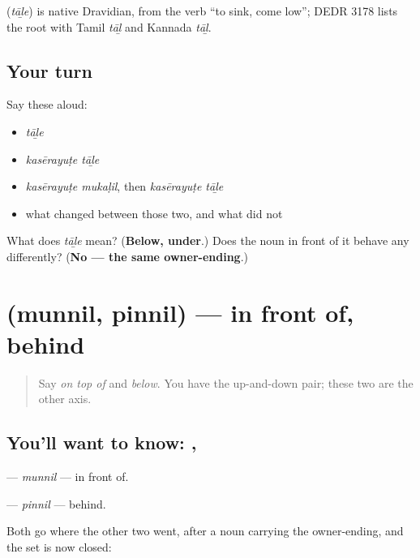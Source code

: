 \begin{cousinweb}
\textbf{} (\emph{tāḻe}) is native Dravidian, from the verb \textquotedblleft{}to sink, come low\textquotedblright{}; DEDR 3178 lists the root with Tamil \emph{tāḻ} and Kannada \emph{tāḻ}.
\end{cousinweb}

\subsection*{Your turn}
Say these aloud:

\begin{itemize}
\raggedright
  \item \emph{tāḻe}
  \item \emph{kasērayuṭe tāḻe}
  \item \emph{kasērayuṭe mukaḷil}, then \emph{kasērayuṭe tāḻe}
  \item what changed between those two, and what did not
\end{itemize}

\begin{tcolorbox}[breakable,colback=teal!4,colframe=teal!35!black,title={Before you move on}]
What does \emph{tāḻe} mean? (\textbf{Below, under}.) Does the noun in front of it behave any differently? (\textbf{No — the same owner-ending}.)
\end{tcolorbox}
\section[\texorpdfstring{\ml{മുന്നിൽ} \ml{പിന്നിൽ} (munnil pinnil)}{മുന്നിൽ പിന്നിൽ (munnil pinnil)}]{  (munnil, pinnil) — in front of, behind}

\label{lesson:ML-C84-munnil-pinnil}



\begin{quote}
Say \emph{on top of} and \emph{below}. You have the up-and-down pair; these two are the other axis.
\end{quote}

\subsection*{You'll want to know: , }
\textbf{} — \emph{munnil} — in front of.

\textbf{} — \emph{pinnil} — behind.

Both go where the other two went, after a noun carrying the owner-ending, and the set is now closed:

